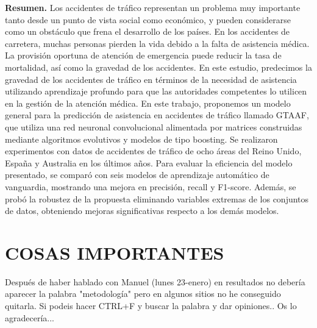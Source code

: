 \documentclass{uathesis-es}
\begin{document}
{		\textbf{Resumen.} Los accidentes de tráfico representan un problema muy importante tanto desde un punto de vista social como económico, y pueden considerarse como un obstáculo que frena el desarrollo de los países. En los accidentes de carretera, muchas personas pierden la vida debido a la falta de asistencia médica. La provisión oportuna de atención de emergencia puede reducir la tasa de mortalidad, así como la gravedad de los accidentes. En este estudio, predecimos la gravedad de los accidentes de tráfico en términos de la necesidad de asistencia utilizando aprendizaje profundo para que las autoridades competentes lo utilicen en la gestión de la atención médica. En este trabajo, proponemos un modelo general para la predicción de asistencia en accidentes de tráfico llamado GTAAF, que utiliza una red neuronal convolucional alimentada por matrices construidas mediante algoritmos evolutivos y modelos de tipo boosting. Se realizaron experimentos con datos de accidentes de tráfico de ocho áreas del Reino Unido, España y Australia en los últimos años. Para evaluar la eficiencia del modelo presentado, se comparó con seis modelos de aprendizaje automático de vanguardia, mostrando una mejora en precisión, recall y F1-score. Además, se probó la robustez de la propuesta eliminando variables extremas de los conjuntos de datos, obteniendo mejoras significativas respecto a los demás modelos.
		
		
		\chapter{COSAS IMPORTANTES}
		
		Después de haber hablado con Manuel (lunes 23-enero) en resultados no debería aparecer la palabra "metodología" pero en algunos sitios no he conseguido quitarla. Si podeis hacer CTRL+F y buscar la palabra y dar opiniones.. Os lo agradecería...
		
		
}
\end{document}
